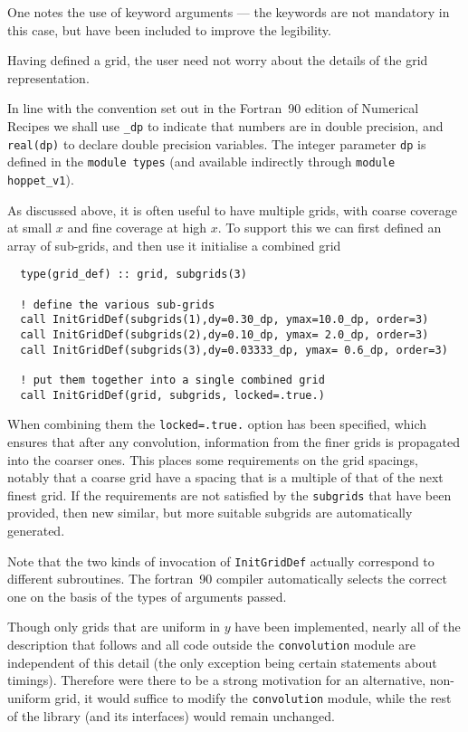 \documentclass[12pt]{article}
\newcommand{\ttt}[1]{\texttt{#1}}
\begin{document}
One notes the use of keyword arguments --- the keywords are not
mandatory in this case, but have been included to improve the
legibility. 

Having defined a grid, the user need not worry about the details of
the grid representation.

In line with the convention set out in the Fortran~90 edition of
Numerical Recipes \cite{NRf90} we shall use \texttt{\_dp} to indicate
that numbers are in double precision, and \ttt{real(dp)} to declare
double precision variables. The integer parameter \ttt{dp} is defined
in the \texttt{module types} (and available indirectly through
\ttt{module hoppet\_v1}).

As discussed above, it is often useful to have multiple grids, with
coarse coverage at small $x$ and fine coverage at high $x$. To support
this we can first defined an array of sub-grids, and then use it
initialise a combined grid
\begin{verbatim}
  type(grid_def) :: grid, subgrids(3)

  ! define the various sub-grids
  call InitGridDef(subgrids(1),dy=0.30_dp, ymax=10.0_dp, order=3)
  call InitGridDef(subgrids(2),dy=0.10_dp, ymax= 2.0_dp, order=3)
  call InitGridDef(subgrids(3),dy=0.03333_dp, ymax= 0.6_dp, order=3)

  ! put them together into a single combined grid
  call InitGridDef(grid, subgrids, locked=.true.)
\end{verbatim}
When combining them the \ttt{locked=.true.} option has been specified,
which ensures that after any convolution, information from the finer
grids is propagated into the coarser ones. This places some
requirements on the grid spacings, notably that a coarse grid have a
spacing that is a multiple of that of the next finest grid. If the
requirements are not satisfied by the \ttt{subgrids} that have been
provided, then new similar, but more suitable subgrids are
automatically generated. 

Note that the two kinds of invocation of \ttt{InitGridDef} actually
correspond to different subroutines. The fortran~90 compiler
automatically selects the correct one on the basis of the types of
arguments passed.

Though only grids that are uniform in $y$ have been implemented,
nearly all of the description that follows and all code outside the
\texttt{convolution} module are independent of this detail (the only
exception being certain statements about timings). Therefore were
there to be a strong motivation for an alternative, non-uniform grid,
it would suffice to modify the \texttt{convolution} module, while the
rest of the library (and its interfaces) would remain unchanged.
\end{document}
